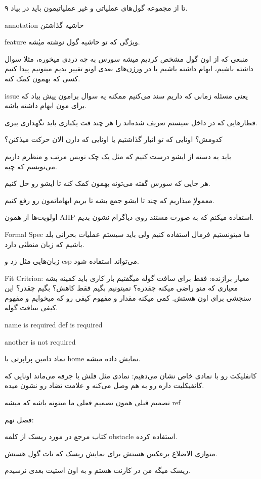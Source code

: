 ۹ تا از مجموعه گول‌های عملیاتی و غیر عملیاتیمون باید در بیاد.

annotation حاشیه گذاشتن

feature ويژگی که تو حاشیه گول نوشته میٰشه.

منبعی که از اون گول مشخص کردیم میشه سورس
به چه دردی میخوره، مثلا سوال داشته باشیم، ابهام داشته باشیم یا در ورژن‌های بعدی
اونو تغییر بدیم میتونیم پیدا کنیم کسی که بهمون کمک کنه.

issue یعنی مسئله زمانی که داریم سند می‌کنیم ممکنه یه سوال برامون پیش بیاد که
برای مون ابهام داشته باشه.

قطار‌هایی که در داخل سیستم تعریف شده‌اند را هر چند قت یکباری باید نگهداری ببری.

کدومش؟ اونایی که تو انبار گذاشتیم یا اونایی که دارن الان حرکت میذکنن؟

باید یه دسته از ایشو درست کنیم که مثل یک چک نویس مرتب و منظرم داریم می‌نویسم که
چیه.

هر جایی که سورس گفته می‌تونه بهمون کمک کنه تا ایشو رو حل کنیم.

معمولاٍ میذاریم که چند تا ایشو جمع بشه تا بریم ابهاماتمون رو رفع کنیم.

اولویت‌ها از همون AHP استفاده میکنم که به صورت مستند روی دیاگرام نشون بدیم.

Formal Spec ما میتونستیم فرمال استفاده کنیم ولی باید سیستم عملیات بحرانی بلد
باشیم که زبان منطثی دارد.

زبان‌هایی مثل زد و csp می‌تواند استفاده شود.

Fit Critrion: معیار برازنده: فقط برای سافت گوله
میگفتیم بار کاری باید کمینه بشه معیاری که منو راضی میکنه چقدره؟ نمیتونیم بگیم
فقط کاهش؟ بگیم چقدر؟ این سنجشی برای اون هستش. کمی میکنه مقدار و مفهوم کیفی رو
که
میخوایم و مفهوم کیفی سافت گوله.

name is required
def is required

another is not required

نماد دامین پراپرتی با home نمایش داده میشه.

کانفلیکت رو با نمادی خاص نشان می‌دهیم: نمادی مثل فلش یا جرفه می‌ماند اونایی که
کانفیکلیت داره رو به هم وصل می‌کنه و علامت تضاد رو نشون میده.

تصمیم قبلی همون تصمیم فعلی ما میتونه باشه که میشه ref

فصل نهم:

کتاب مرجع در مورد ریسک از کلمه obstacle استفاده کرده.

متوازی الاضلاع برعکس هستش برای نمایش ریسک که نات گول هستش.

ریسک میگه من در کارنت هستم و به اون استیت بعدی نرسیدم.

